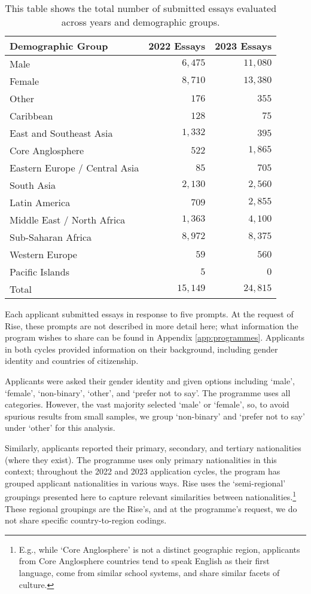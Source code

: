 \begin{table}[htbp]
    \centering
    \caption{This table shows the total number of submitted essays evaluated across years and demographic groups.}
    \label{tab:demo_counts}
    \begin{tabular}{ l r r }
        \toprule
        Demographic Group & 2022 Essays & 2023 Essays \\
        \midrule
        Male & $6,475$  & $11,080$ \\
        Female & $8,710$  & $13,380$ \\
        Other & $176$ & $355$ \\
        \midrule
        Caribbean & $128$ & $75$ \\
        East and Southeast Asia & $1,332$ & $395$ \\
        Core Anglosphere & $522$ & $1,865$ \\
        Eastern Europe / Central Asia & $85$ & $705$ \\
        South Asia & $2,130$ & $2,560$\\
        Latin America & $709$ & $2,855$ \\
        Middle East / North Africa & $1,363$ & $4,100$ \\
        Sub-Saharan Africa & $8,972$& $8,375$\\
        Western Europe & $59$ & $560$ \\
        Pacific Islands & $5$& $0$ \\
        \midrule
        Total & $15,149$ & $24,815$ \\
        \bottomrule
    \end{tabular}
\end{table}

Each applicant submitted essays in response to five prompts. At the request of Rise, these prompts are not described in more detail here; what information the program wishes to share can be found in Appendix \ref{app:programmes}. Applicants in both cycles provided information on their background, including gender identity and countries of citizenship. 

Applicants were asked their gender identity and given options including `male', `female', `non-binary', `other', and `prefer not to say'. The programme uses all categories. However, the vast majority selected `male' or `female', so, to avoid spurious results from small samples, we group `non-binary' and `prefer not to say' under `other' for this analysis. 

Similarly, applicants reported their primary, secondary, and tertiary nationalities (where they exist). The programme uses only primary nationalities in this context; throughout the 2022 and 2023 application cycles, the program has grouped applicant nationalities in various ways. Rise uses the `semi-regional' groupings presented here to capture relevant similarities between nationalities.\footnote{E.g., while `Core Anglosphere' is not a distinct geographic region, applicants from Core Anglosphere countries tend to speak English as their first language, come from similar school systems, and share similar facets of culture.} These regional groupings are the Rise's, and at the programme's request, we do not share specific country-to-region codings.

